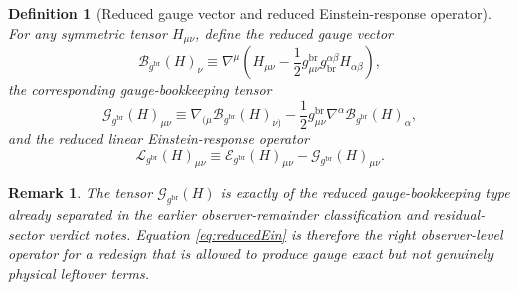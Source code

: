 \documentclass[11pt]{article}
\newcommand{\ObserverMetric}{g^{\mathrm{br}}}
\newcommand{\EinLin}{\mathcal E_{\ObserverMetric}}
\newcommand{\GaugeBook}{\mathcal G_{\ObserverMetric}}
\newcommand{\ReducedEin}{\mathcal L_{\ObserverMetric}}
\newcommand{\GaugeVec}{\mathcal B_{\ObserverMetric}}
\newtheorem{definition}{Definition}
\newtheorem{remark}{Remark}
\begin{document}
\begin{definition}[Reduced gauge vector and reduced Einstein-response operator]
\label{def:reduced}
For any symmetric tensor \(H_{\mu\nu}\), define the reduced gauge vector
\begin{equation}
\GaugeVec(H)_\nu
\equiv
\nabla^\mu\left(
H_{\mu\nu}
-\frac12 \ObserverMetric_{\mu\nu}g_{\mathrm{br}}^{\alpha\beta}H_{\alpha\beta}
\right),
\label{eq:gaugevec}
\end{equation}
the corresponding gauge-bookkeeping tensor
\begin{equation}
\GaugeBook(H)_{\mu\nu}
\equiv
\nabla_{(\mu}\GaugeVec(H)_{\nu)}
-\frac12\ObserverMetric_{\mu\nu}\nabla^\alpha\GaugeVec(H)_\alpha,
\label{eq:gbook}
\end{equation}
and the reduced linear Einstein-response operator
\begin{equation}
\ReducedEin(H)_{\mu\nu}
\equiv
\EinLin(H)_{\mu\nu}
-\GaugeBook(H)_{\mu\nu}.
\label{eq:reducedEin}
\end{equation}
\end{definition}

\begin{remark}
The tensor \(\GaugeBook(H)\) is exactly of the reduced gauge-bookkeeping type already separated in the earlier observer-remainder classification and residual-sector verdict notes. Equation \eqref{eq:reducedEin} is therefore the right observer-level operator for a redesign that is allowed to produce gauge exact but not genuinely physical leftover terms.
\end{remark}
\end{document}
